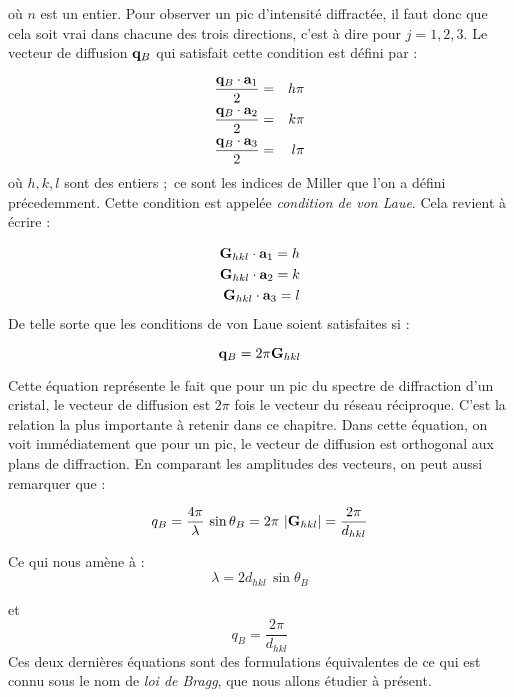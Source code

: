 où $n$ est un entier. Pour observer un pic d'intensité diffractée, il faut donc
que cela soit vrai dans chacune des trois directions, c'est à dire pour
$j = 1,2,3$. Le vecteur de diffusion $\mathbf{q}_B$ qui satisfait cette condition
est défini par :

\begin{eqnarray}
    \frac{\mathbf{q}_B \cdot \mathbf{a}_1}{2} & = & h \pi \\
    \frac{\mathbf{q}_B \cdot \mathbf{a}_2}{2} & = & k \pi \\
    \frac{\mathbf{q}_B \cdot \mathbf{a}_3}{2} & = & l \pi
\end{eqnarray}
où $h,k,l$ sont des entiers ; ce sont les indices de Miller que l'on a défini précedemment.
Cette condition est appelée \emph{condition de von Laue}. Cela revient à écrire :

\begin{eqnarray}
    \mathbf{G}_{hkl} \cdot \mathbf{a}_1 = h \\
    \mathbf{G}_{hkl} \cdot \mathbf{a}_2 = k \\
    \mathbf{G}_{hkl} \cdot \mathbf{a}_3 = l
\end{eqnarray}
De telle sorte que les conditions de von Laue soient satisfaites si :

\begin{equation}
    \mathbf{q}_B = 2\pi \mathbf{G}_{hkl}
\end{equation}

Cette équation représente le fait que pour un pic du spectre de diffraction d'un
cristal, le vecteur de diffusion est $2 \pi$ fois le vecteur du réseau réciproque. C'est la relation la plus importante à retenir dans ce chapitre. Dans cette équation, on voit immédiatement que pour un pic, le vecteur de diffusion est orthogonal aux plans de diffraction. En comparant les amplitudes des vecteurs, on peut aussi
remarquer que :

\begin{equation}
    q_B = \frac{4\pi}{\lambda}\, \sin \theta_B = 2\pi\, \left| \mathbf{G}_{hkl} \right| = \frac{2\pi}{d_{hkl}}
\end{equation}

Ce qui nous amène à :
\begin{equation}
    \lambda = 2 d_{hkl}\, \sin \theta_B
\end{equation}

et
\begin{equation}
    q_B = \frac{2\pi}{d_{hkl}}
\end{equation}
Ces deux dernières équations sont des formulations équivalentes de ce qui est
connu sous le nom de \emph{loi de Bragg}, que nous allons étudier à présent.

